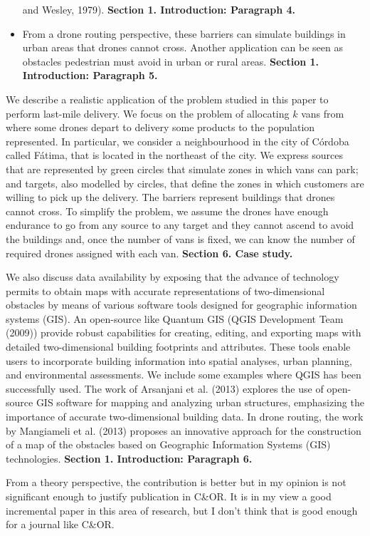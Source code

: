 \documentclass{article}
\newenvironment{reviewer}{\setcounter{pointcounter}{1}}{}
\newcommand{\point}{\text{{\selectfont \thepointcounter} \stepcounter{pointcounter}}}
\begin{document}
\begin{reviewer}
\begin{tcolorbox}[breakable,enhanced,coltitle=black,colback=red!5!white,colframe=red!75!black,title=\textbf{Answer R1.\point},borderline={1pt}{0pt}{black},boxrule=0pt]
\begin{itemize}
				and Wesley, 1979). \textbf{Section 1. Introduction: Paragraph 4.}
				\item From a drone routing perspective, these barriers can simulate buildings in urban areas that drones cannot cross. Another application can be seen as obstacles pedestrian
				must avoid in urban or rural areas. \textbf{Section 1. Introduction: Paragraph 5.}
			\end{itemize}
			We describe a realistic application of the problem studied in this paper to perform last-mile delivery. We focus on the problem of allocating $k$ vans from where some drones depart to delivery some products to the population represented. In particular, we consider a neighbourhood in the city of Córdoba called Fátima, that is located in the northeast of the city. We express sources that are represented by green circles that simulate zones in which vans can park; and targets, also modelled by circles,  that define the zones in which customers are willing to pick up the delivery. The barriers represent buildings that drones cannot cross. To simplify the problem, we assume the drones have enough endurance to go from any source to any target and they cannot ascend to avoid the buildings and, once the number of vans is fixed, we can know the number of required drones assigned with each van. \textbf{Section 6. Case study. }
			
			We also discuss data availability by exposing that the advance of technology permits to obtain maps with accurate representations of two-dimensional obstacles by means of various software tools designed for geographic information systems (GIS). An open-source like Quantum GIS (QGIS Development Team (2009)) provide robust capabilities for creating, editing, and exporting maps with detailed two-dimensional building footprints and attributes. These tools enable users to incorporate building information into spatial analyses, urban planning, and environmental assessments. We include some examples where QGIS has been successfully used. The work of Arsanjani et al. (2013) explores the use of open-source GIS software for mapping and analyzing urban structures, emphasizing the importance of accurate two-dimensional building data. In drone routing, the work by Mangiameli et al. (2013) proposes an innovative approach	for the construction of a map of the obstacles based on Geographic Information Systems (GIS) technologies. \textbf{Section 1. Introduction: Paragraph 6.}
		\end{tcolorbox}
		
		\begin{itshape}
			From a theory perspective, the contribution is better but in my opinion is not significant enough to justify publication in C\&OR. It is in my view a good incremental paper in this area of research, but I don't think that is good enough for a journal like C\&OR.
		\end{itshape}
		

\end{reviewer}
\end{document}
